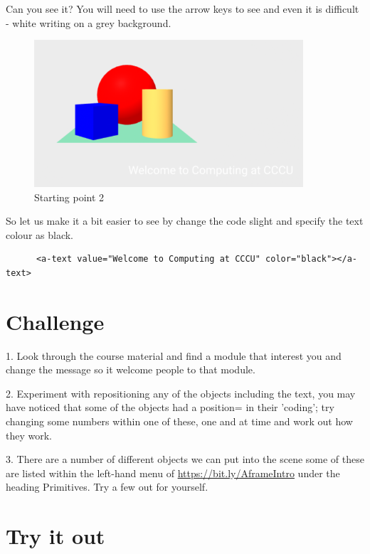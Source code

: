 Can you see it? You will need to use the arrow keys to see and even it is difficult - white writing on a grey background.

\begin{figure}
    \centering
    \includegraphics[width=10cm]{chapters/chapter1/figures/schools5.png}
    \caption{Starting point 2}
    \label{fig:schools5}
\end{figure}

So let us make it a bit easier to see by change the code slight and specify the text colour as black.

\begin{lstlisting}
      <a-text value="Welcome to Computing at CCCU" color="black"></a-text>
\end{lstlisting}

\section{Challenge}

1. Look through the course material and find a module that interest you and change the message so it welcome people to that module.

2. Experiment with repositioning any of the objects including the text, you may have noticed that some of the objects had a position= in their 'coding'; try changing some numbers within one of these, one and at time and work out how they work.

3. There are a number of different objects we can put into the scene some of these are listed within the left-hand menu of \url{https://bit.ly/AframeIntro} under the heading Primitives. Try a few out for yourself.


\section{Try it out}


